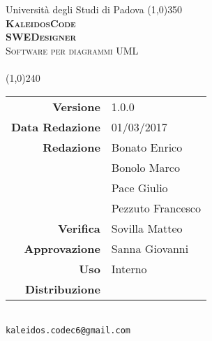 \documentclass[a4paper,12pt]{article}
\author{KaleidosCode}
\date{03/03/2017}	%
\begin{document}
	\begin{titlepage}
		\centering Università degli Studi di Padova
		\line(1,0){350}\\
		\vspace{0.4cm}
		{\bfseries\scshape\LARGE KaleidosCode\\}
		\vspace{0.4cm}
		{\bfseries\scshape\LARGE SWEDesigner\\}
		{\scshape\Large Software per diagrammi UML\\}
		\vspace{1cm}
		{\scshape\Large \normediprogettoi\ \\}		%
		\vspace{1.4cm}
		\logo
		\vspace{1.2cm}
		\line(1,0){240}\\
		\begin{tabular}{r|l}
			{\hfill \textbf{Versione}} 			& 1.0.0\\
			{\hfill \textbf{Data Redazione}} 	& 01/03/2017\\	%
			{\hfill \textbf{Redazione}} 		& Bonato Enrico\\ & Bonolo Marco\\ & Pace Giulio\\ & Pezzuto Francesco\\
			{\hfill \textbf{Verifica}} 			& Sovilla Matteo\\
			{\hfill \textbf{Approvazione}} 		& Sanna Giovanni\\
			{\hfill \textbf{Uso}} 				& Interno\\
			{\hfill \textbf{Distribuzione}} 	& \kaleidoscode\\
		\end{tabular}\\
		\vspace{2cm}
		\texttt{kaleidos.codec6@gmail.com}
	\end{titlepage}

	\pagestyle{myfront}
	\newpage
		
	\newpage
		\tableofcontents
	\newpage
		\listoffigures
	\newpage
	\pagestyle{mymain}
		
	\newpage
		
	\newpage
		
	\newpage
		
	\newpage
		
	\appendix
	\newpage
		
	\label{LastPage}
\end{document}
